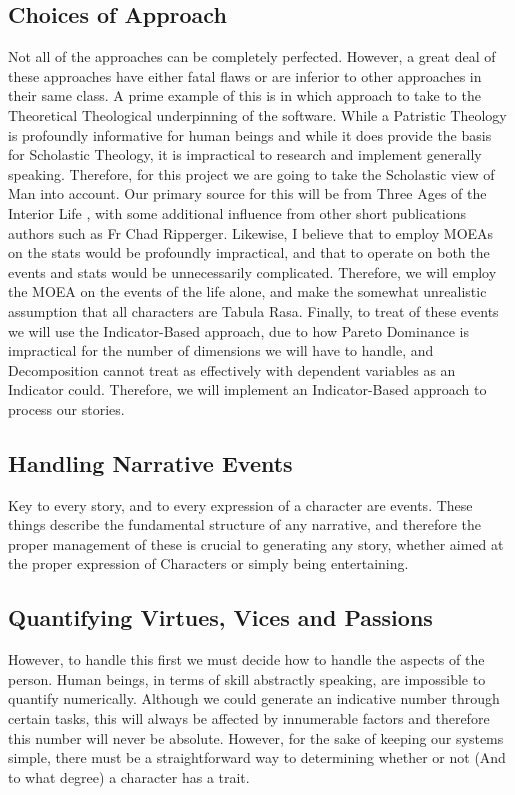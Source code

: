 \documentclass[11pt]{article}
\begin{document}
\subsection{Choices of Approach}
Not all of the approaches can be completely perfected. However, a great deal of these approaches have either fatal flaws or are inferior to other approaches in their same class. A prime example of this is in which approach to take to the Theoretical Theological underpinning of the software. While a Patristic Theology is profoundly informative for human beings and while it does provide the basis for Scholastic Theology, it is impractical to research and implement generally speaking. Therefore, for this project we are going to take the Scholastic view of Man into account. Our primary source for this will be from Three Ages of the Interior Life \cite{garrigou2013three}, with some additional influence from other short publications authors such as Fr Chad Ripperger. Likewise, I believe that to employ MOEAs on the stats would be profoundly impractical, and that to operate on both the events and stats would be unnecessarily complicated. Therefore, we will employ the MOEA on the events of the life alone, and make the somewhat unrealistic assumption that all characters are Tabula Rasa. Finally, to treat of these events we will use the Indicator-Based approach, due to how Pareto Dominance is impractical for the number of dimensions we will have to handle, and Decomposition cannot treat as effectively with dependent variables as an Indicator could. Therefore, we will implement an Indicator-Based approach to process our stories. 

\subsection{Handling Narrative Events}
Key to every story, and to every expression of a character are events. These things describe the fundamental structure of any narrative, and therefore the proper management of these is crucial to generating any story, whether aimed at the proper expression of Characters or simply being entertaining. 

\subsection{Quantifying Virtues, Vices and Passions}
However, to handle this first we must decide how to handle the aspects of the person. Human beings, in terms of skill abstractly speaking, are impossible to quantify numerically. Although we could generate an indicative number through certain tasks, this will always be affected by innumerable factors and therefore this number will never be absolute. However, for the sake of keeping our systems simple, there must be a straightforward way to determining whether or not (And to what degree) a character has a trait. \\
\end{document}
